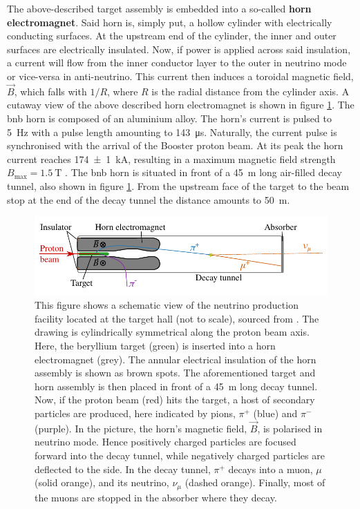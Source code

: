 The above-described target assembly is embedded into a so-called \textbf{horn electromagnet}. Said horn is, simply put, a hollow cylinder with electrically conducting surfaces. At the upstream end of the cylinder, the inner and outer surfaces are electrically insulated. Now, if power is applied across said insulation, a current will flow from the inner conductor layer to the outer in neutrino mode or vice-versa in anti-neutrino. This current then induces a toroidal magnetic field, $\vec{B}$, which falls with $1/R$, where $R$ is the radial distance from the cylinder axis. A cutaway view of the above described horn electromagnet is shown in figure \ref{fig:BNBNeutrinoProduction}. The \gls{bnb} horn is composed of an aluminium alloy. The horn's current is pulsed to \SI{5}{\hertz} with a pulse length amounting to \SI{143}{\micro\second}. Naturally, the current pulse is synchronised with the arrival of the Booster proton beam. At its peak the horn current reaches \SI{174(1)}{\kilo\ampere}, resulting in a maximum magnetic field strength $B_\text{max} = \SI{1.5}{\tesla}$ \cite{BNBBeamFlux}. The \gls{bnb} horn is situated in front of a \SI{45}{\metre} long air-filled decay tunnel, also shown in figure \ref{fig:BNBNeutrinoProduction}. From the upstream face of the target to the beam stop at the end of the decay tunnel the distance amounts to \SI{50}{\metre}.
\begin{figure}[htbp]
    \centering
    \includegraphics[width=1.0\textwidth]{images/MicroBooNE/BNBNeutrinoProduction.pdf}
    \caption[Neutrino Production Process at the BNB Target Hall]{This figure shows a schematic view of the neutrino production facility located at the target hall (not to scale), sourced from \cite{LArLaserPhDMatthias}. The drawing is cylindrically symmetrical along the proton beam axis. Here, the beryllium target (green) is inserted into a horn electromagnet (grey). The annular electrical insulation of the horn assembly is shown as brown spots. The aforementioned target and horn assembly is then placed in front of a \SI{45}{\metre} long decay tunnel. Now, if the proton beam (red) hits the target, a host of secondary particles are produced, here indicated by pions, $\pi^+$ (blue) and $\pi^-$ (purple). In the picture, the horn's magnetic field, $\vec{B}$, is polarised in neutrino mode. Hence positively charged particles are focused forward into the decay tunnel, while negatively charged particles are deflected to the side. In the decay tunnel, $\pi^+$ decays into a muon, $\mu$ (solid orange), and its neutrino, $\nu_\mu$ (dashed orange). Finally, most of the muons are stopped in the absorber where they decay.}
    \label{fig:BNBNeutrinoProduction}
\end{figure}

